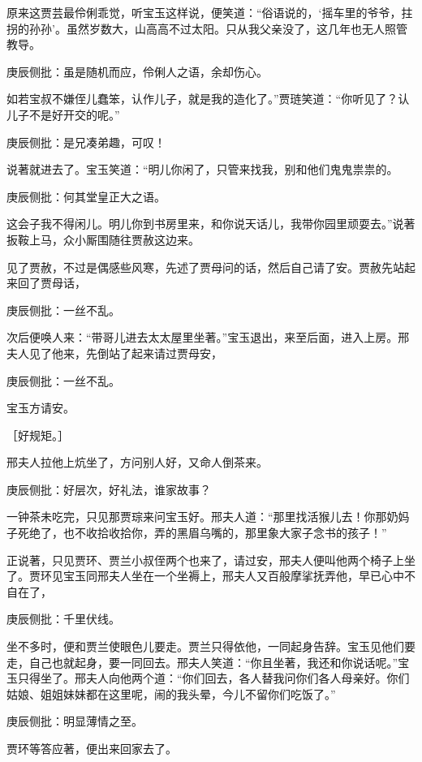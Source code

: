 \begin{parag}


    原来这贾芸最伶俐乖觉，听宝玉这样说，便笑道：“俗语说的，‘摇车里的爷爷，拄拐的孙孙’。虽然岁数大，山高高不过太阳。只从我父亲没了，这几年也无人照管教导。\begin{note}庚辰侧批：虽是随机而应，伶俐人之语，余却伤心。\end{note}如若宝叔不嫌侄儿蠢笨，认作儿子，就是我的造化了。”贾琏笑道：“你听见了？认儿子不是好开交的呢。”\begin{note}庚辰侧批：是兄凑弟趣，可叹！\end{note}说著就进去了。宝玉笑道：“明儿你闲了，只管来找我，别和他们鬼鬼祟祟的。\begin{note}庚辰侧批：何其堂皇正大之语。\end{note}这会子我不得闲儿。明儿你到书房里来，和你说天话儿，我带你园里顽耍去。”说著扳鞍上马，众小厮围随往贾赦这边来。
\end{parag}


\begin{parag}


    见了贾赦，不过是偶感些风寒，先述了贾母问的话，然后自己请了安。贾赦先站起来回了贾母话，\begin{note}庚辰侧批：一丝不乱。\end{note}次后便唤人来：“带哥儿进去太太屋里坐著。”宝玉退出，来至后面，进入上房。邢夫人见了他来，先倒站了起来请过贾母安，\begin{note}庚辰侧批：一丝不乱。\end{note}宝玉方请安。\begin{note}［好规矩。］\end{note}邢夫人拉他上炕坐了，方问别人好，又命人倒茶来。\begin{note}庚辰侧批：好层次，好礼法，谁家故事？\end{note}一钟茶未吃完，只见那贾琮来问宝玉好。邢夫人道：“那里找活猴儿去！你那奶妈子死绝了，也不收拾收拾你，弄的黑眉乌嘴的，那里象大家子念书的孩子！”
\end{parag}


\begin{parag}


    正说著，只见贾环、贾兰小叔侄两个也来了，请过安，邢夫人便叫他两个椅子上坐了。贾环见宝玉同邢夫人坐在一个坐褥上，邢夫人又百般摩挲抚弄他，早已心中不自在了，\begin{note}庚辰侧批：千里伏线。\end{note}坐不多时，便和贾兰使眼色儿要走。贾兰只得依他，一同起身告辞。宝玉见他们要走，自己也就起身，要一同回去。邢夫人笑道：“你且坐著，我还和你说话呢。”宝玉只得坐了。邢夫人向他两个道：“你们回去，各人替我问你们各人母亲好。你们姑娘、姐姐妹妹都在这里呢，闹的我头晕，今儿不留你们吃饭了。”\begin{note}庚辰侧批：明显薄情之至。\end{note}贾环等答应著，便出来回家去了。
\end{parag}


